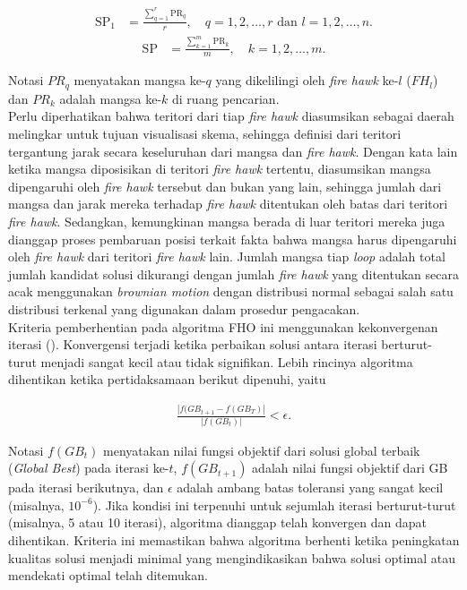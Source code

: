 \begin{align}
    \text{SP}_1 &= \frac{\sum_{q=1}^r \text{PR}_q}{r}, \quad q = 1, 2, \ldots, r \text{ dan } l = 1, 2, \ldots, n.\end{align}
\begin{align}
    \text{SP} &= \frac{\sum_{k=1}^m \text{PR}_k}{m}, \quad k = 1, 2, \ldots, m.
\end{align}
    
Notasi $PR_q$ menyatakan mangsa ke-$q$ yang dikelilingi oleh \textit{fire hawk} ke-$l$ ($FH_l$) dan $PR_k$ adalah mangsa ke-$k$ di ruang pencarian.\\

Perlu diperhatikan bahwa teritori dari tiap \textit{fire hawk} diasumsikan sebagai daerah melingkar untuk tujuan visualisasi skema, sehingga definisi dari teritori tergantung jarak secara keseluruhan dari mangsa dan \textit{fire hawk}. Dengan kata lain ketika mangsa diposisikan di teritori \textit{fire hawk} tertentu, diasumsikan mangsa dipengaruhi oleh \textit{fire hawk} tersebut dan bukan yang lain, sehingga jumlah dari mangsa dan jarak mereka terhadap \textit{fire hawk} ditentukan oleh batas dari teritori \textit{fire hawk}. Sedangkan, kemungkinan mangsa berada di luar teritori mereka juga dianggap proses pembaruan posisi terkait fakta bahwa mangsa harus dipengaruhi oleh \textit{fire hawk} dari teritori \textit{fire hawk} lain. Jumlah mangsa tiap \textit{loop} adalah total jumlah kandidat solusi dikurangi dengan jumlah \textit{fire hawk} yang ditentukan secara acak menggunakan \textit{brownian motion} dengan distribusi normal sebagai salah satu distribusi terkenal yang digunakan dalam prosedur pengacakan.\\

Kriteria pemberhentian pada algoritma FHO ini menggunakan kekonvergenan iterasi (). Konvergensi terjadi ketika perbaikan solusi antara iterasi berturut-turut menjadi sangat kecil atau tidak signifikan. Lebih rincinya algoritma dihentikan ketika pertidaksamaan berikut dipenuhi, yaitu

\begin{align*}
    \frac{|f(GB_{t+1}-f(GB_T)|}{|f(GB_t)|} < \epsilon.
\end{align*}

 Notasi $f(GB_t)$ menyatakan nilai fungsi objektif dari solusi global terbaik (\textit{Global Best}) pada iterasi ke-$t$, $f(GB_{t+1})$ adalah nilai fungsi objektif dari GB pada iterasi berikutnya, dan $\epsilon$ adalah ambang batas toleransi yang sangat kecil (misalnya, $10^{-6}$). Jika kondisi ini terpenuhi untuk sejumlah iterasi berturut-turut (misalnya, 5 atau 10 iterasi), algoritma dianggap telah konvergen dan dapat dihentikan. Kriteria ini memastikan bahwa algoritma berhenti ketika peningkatan kualitas solusi menjadi minimal yang mengindikasikan bahwa solusi optimal atau mendekati optimal telah ditemukan.

